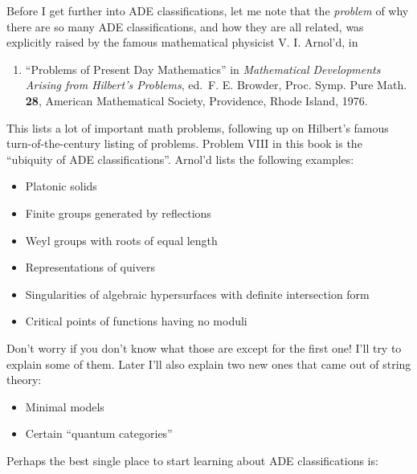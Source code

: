 \documentclass{article}
\def\tightlist{}
\renewcommand{\texttt}[1]{%
  \begingroup
  \ttfamily
  \begingroup\lccode`~=`/\lowercase{\endgroup\def~}{/\discretionary{}{}{}}%
  \begingroup\lccode`~=`[\lowercase{\endgroup\def~}{[\discretionary{}{}{}}%
  \begingroup\lccode`~=`.\lowercase{\endgroup\def~}{.\discretionary{}{}{}}%
  \catcode`/=\active\catcode`[=\active\catcode`.=\active
  \scantokens{#1\noexpand}%
  \endgroup
}
\begin{document}
Before I get further into ADE classifications, let me note that the
\emph{problem} of why there are so many ADE classifications, and how
they are all related, was explicitly raised by the famous mathematical
physicist V. I. Arnol'd, in

\begin{enumerate}
\def\labelenumi{\arabic{enumi})}
\setcounter{enumi}{1}
\tightlist
\item
  ``Problems of Present Day Mathematics'' in \emph{Mathematical
  Developments Arising from Hilbert's Problems}, ed.~F. E. Browder,
  Proc. Symp. Pure Math. \textbf{28}, American Mathematical Society,
  Providence, Rhode Island, 1976.
\end{enumerate}

This lists a lot of important math problems, following up on Hilbert's
famous turn-of-the-century listing of problems. Problem VIII in this
book is the ``ubiquity of ADE classifications''. Arnol'd lists the
following examples:

\begin{itemize}
\tightlist
\item
  Platonic solids
\item
  Finite groups generated by reflections
\item
  Weyl groups with roots of equal length
\item
  Representations of quivers
\item
  Singularities of algebraic hypersurfaces with definite intersection
  form
\item
  Critical points of functions having no moduli
\end{itemize}

Don't worry if you don't know what those are except for the first one!
I'll try to explain some of them. Later I'll also explain two new ones
that came out of string theory:

\begin{itemize}
\tightlist
\item
  Minimal models
\item
  Certain ``quantum categories''
\end{itemize}

Perhaps the best single place to start learning about ADE
classifications is:

\end{document}
